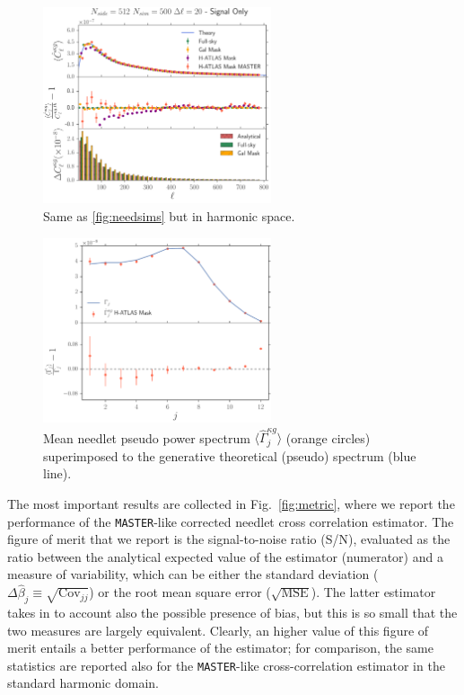 \begin{figure}[tbp]
\centering
\includegraphics[width=0.6\textwidth]{Chapter5/Images/pipeline_val_cl_nside512_nsim500.pdf}
\caption{\label{fig:clsims} Same as \eqref{fig:needsims} but in harmonic space. }
\end{figure}

\begin{figure}
\centering
\includegraphics[width=0.6\textwidth]{Chapter5/Images/master_beta.pdf}
\caption{Mean needlet pseudo power spectrum $\langle \hat{\Gamma}^{\kappa g}_j\rangle$ 
(orange circles) superimposed to the generative theoretical (pseudo) spectrum (blue line).}
\label{fig:gammaj}
\end{figure}


The most important results are collected in Fig.~\eqref{fig:metric}, where we report the performance of the \texttt{MASTER}-like corrected needlet cross correlation estimator. The figure of merit that we report is the signal-to-noise ratio (S/N), evaluated as the ratio between the analytical expected value of the estimator (numerator) and a measure of variability, which can be either the standard deviation ($\Delta\hat{\beta}_j \equiv \sqrt{\text{Cov}_{jj}}$) or the root mean square error ($\sqrt{\text{MSE}}$). The latter estimator takes in to account also the possible presence of bias, but this is so small that the two measures are largely equivalent. Clearly, an higher value of this figure of merit entails a better performance of the estimator; for comparison, the same statistics are reported also for the \texttt{MASTER}-like cross-correlation estimator in the standard harmonic domain.

